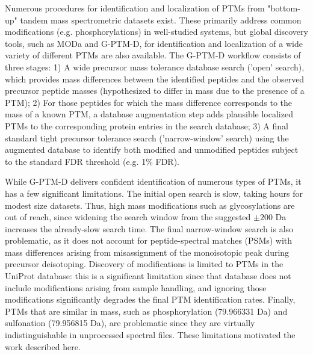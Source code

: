 \documentclass[journal=jprobs,manuscript=article]{achemso}
\begin{document}
Numerous procedures for identification and localization of PTMs from "bottom-up" tandem mass spectrometric datasets exist.
These primarily address common modifications (e.g. phosphorylations) in well-studied systems, but global discovery tools, such as MODa\citep{Na_2011} and G-PTM-D\citep{Li_2016}, for identification and localization of a wide variety of different PTMs are also available.
The G-PTM-D workflow consists of three stages: 1) A wide precursor mass tolerance database search ('open' search)\citep{Chick_2015, Na_2011}, which provides mass differences between the identified peptides and the observed precursor peptide masses (hypothesized to differ in mass due to the presence of a PTM);
2) For those peptides for which the mass difference corresponds to the mass of a known PTM, a database augmentation step adds plausible localized PTMs to the corresponding protein entries in the search database;
3) A final standard tight precursor tolerance search ('narrow-window' search) using the augmented database to identify both modified and unmodified peptides subject to the standard FDR threshold (e.g. 1\% FDR).

While G-PTM-D delivers confident identification of numerous types of PTMs, it has a few significant limitations.
The initial open search is slow, taking hours for modest size datasets.
Thus, high mass modifications such as glycosylations are out of reach, since widening the search window from the suggested $\pm 200$ Da increases the already-slow search time.
The final narrow-window search is also problematic, as it does not account for peptide-spectral matches (PSMs) with mass differences arising from misassignment of the monoisotopic peak during precursor deisotoping.
Discovery of modifications is limited to PTMs in the UniProt database: this is a significant limitation since that database does not include modifications arising from sample handling, and ignoring those modifications significantly degrades the final PTM identification rates.
Finally, PTMs that are similar in mass, such as phosphorylation (79.966331 Da) and sulfonation (79.956815 Da), are problematic since they are virtually indistinguishable in unprocessed spectral files.
These limitations motivated the work described here.
\end{document}
